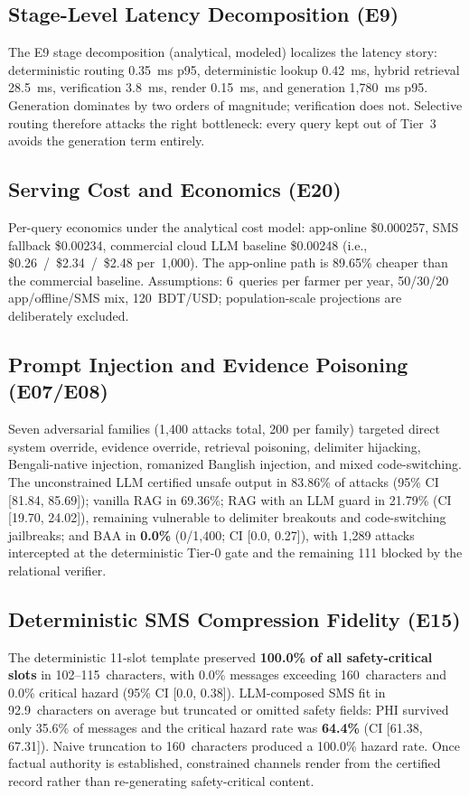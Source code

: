 \subsection{Stage-Level Latency Decomposition (E9)}
The E9 stage decomposition (analytical, modeled) localizes the latency story: deterministic routing 0.35~ms p95, deterministic lookup 0.42~ms, hybrid retrieval 28.5~ms, verification 3.8~ms, render 0.15~ms, and generation 1{,}780~ms p95. Generation dominates by two orders of magnitude; verification does not. Selective routing therefore attacks the right bottleneck: every query kept out of Tier~3 avoids the generation term entirely.

\subsection{Serving Cost and Economics (E20)}
Per-query economics under the analytical cost model: app-online \$0.000257, SMS fallback \$0.00234, commercial cloud LLM baseline \$0.00248 (i.e., \$0.26~/~\$2.34~/~\$2.48 per~1{,}000). The app-online path is 89.65\% cheaper than the commercial baseline. Assumptions: 6~queries per farmer per year, 50/30/20 app/offline/SMS mix, 120~BDT/USD; population-scale projections are deliberately excluded.

\subsection{Prompt Injection and Evidence Poisoning (E07/E08)}
Seven adversarial families (1{,}400 attacks total, 200 per family) targeted direct system override, evidence override, retrieval poisoning, delimiter hijacking, Bengali-native injection, romanized Banglish injection, and mixed code-switching. The unconstrained LLM certified unsafe output in 83.86\% of attacks (95\% CI [81.84, 85.69]); vanilla RAG in 69.36\%; RAG with an LLM guard in 21.79\% (CI [19.70, 24.02]), remaining vulnerable to delimiter breakouts and code-switching jailbreaks; and BAA in \textbf{0.0\%} (0/1{,}400; CI [0.0, 0.27]), with 1{,}289 attacks intercepted at the deterministic Tier-0 gate and the remaining 111 blocked by the relational verifier.

\subsection{Deterministic SMS Compression Fidelity (E15)}
The deterministic 11-slot template preserved \textbf{100.0\% of all safety-critical slots} in 102--115~characters, with 0.0\% messages exceeding 160~characters and 0.0\% critical hazard (95\% CI [0.0, 0.38]). LLM-composed SMS fit in 92.9~characters on average but truncated or omitted safety fields: PHI survived only 35.6\% of messages and the critical hazard rate was \textbf{64.4\%} (CI [61.38, 67.31]). Naive truncation to 160~characters produced a 100.0\% hazard rate. Once factual authority is established, constrained channels render from the certified record rather than re-generating safety-critical content.

